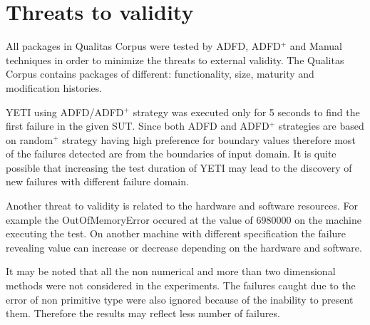 


\section{Threats to validity} \label{sec:threat}
All packages in Qualitas Corpus were tested by ADFD, ADFD$^+$ and Manual techniques in order to minimize the threats to external validity. The Qualitas Corpus contains packages of different: functionality, size, maturity and modification histories.

YETI using ADFD/ADFD$^+$ strategy was executed only for 5 seconds to find the first failure in the given SUT. Since both ADFD and ADFD$^+$ strategies are based on random$^+$ strategy having high preference for boundary values therefore most of the failures detected are from the boundaries of input domain. It is quite possible that increasing the test duration of YETI may lead to the discovery of new failures with different failure domain.

Another threat to validity is related to the hardware and software resources. For example the OutOfMemoryError occured at the value of 6980000 on the machine executing the test. On another machine with different specification the failure revealing value can increase or decrease depending on the hardware and software.

It may be noted that all the non numerical and more than two dimensional methods were not considered in the experiments. The failures caught due to the error of non primitive type were also ignored because of the inability to present them. Therefore the results may reflect less number of failures.












